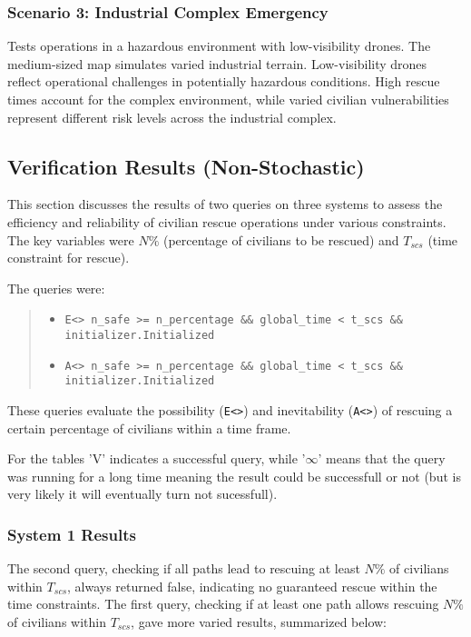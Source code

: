 \subsubsection{Scenario 3: Industrial Complex Emergency}
Tests operations in a hazardous environment with low-visibility drones. The medium-sized map simulates varied industrial terrain. Low-visibility drones reflect operational challenges in potentially hazardous conditions. High rescue times account for the complex environment, while varied civilian vulnerabilities represent different risk levels across the industrial complex.

\subsection{Verification Results (Non-Stochastic)}

This section discusses the results of two queries on three systems to assess the efficiency and reliability of civilian rescue operations under various constraints. The key variables were $N\%$ (percentage of civilians to be rescued) and $T_{scs}$ (time constraint for rescue).

The queries were:


\begin{quote}
	\raggedright
	\begin{itemize}
		\item \texttt{E<> n\_safe >= n\_percentage \&\& global\_time < t\_scs \&\& initializer.Initialized}
		\item \texttt{A<> n\_safe >= n\_percentage \&\& global\_time < t\_scs \&\& initializer.Initialized}
	\end{itemize}
\end{quote}

These queries evaluate the possibility (\texttt{E<>}) and inevitability (\texttt{A<>}) of rescuing a certain percentage of civilians within a time frame.

For the tables 'V' indicates a successful query, while '$\infty$' means that the query was running for a long time meaning the result could be successfull or not (but is very likely it will eventually turn not sucessfull). 

\subsubsection{System 1 Results}

The second query, checking if all paths lead to rescuing at least $N\%$ of civilians within $T_{scs}$, always returned false, indicating no guaranteed rescue within the time constraints. The first query, checking if at least one path allows rescuing $N\%$ of civilians within $T_{scs}$, gave more varied results, summarized below:

